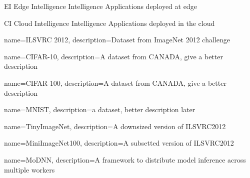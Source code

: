 	{EI}
	{Edge Intelligence}
	{Intelligence Applications deployed at edge}
	
{CI}
{Cloud Intelligence}
{Intelligence Applications deployed in the cloud}
	

{
	name={ILSVRC 2012},
	description={Dataset from ImageNet 2012 challenge}
}

{
	name={CIFAR-10},
	description={A dataset from CANADA, give a better description}
}

{
	name={CIFAR-100},
	description={A dataset from CANADA, give a better description}
}

{
	name={MNIST},
	description={a dataset, better description later}
}

{
	name={TinyImageNet},
	description={A downsized version of ILSVRC2012}
}

{
	name={MiniImageNet100},
	description={A subsetted version of ILSVRC2012}
}

{
	name={MoDNN},
	description={A framework to distribute model inference across multiple workers}
}

